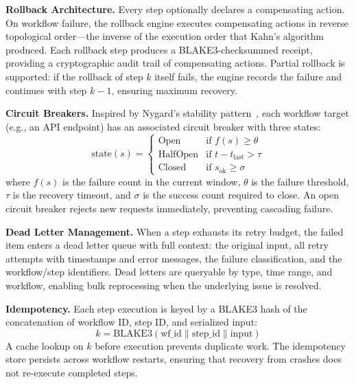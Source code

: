 \documentclass[10pt, twocolumn]{article}
\begin{document}
\textbf{Rollback Architecture.} Every step optionally declares a compensating action. On workflow failure, the rollback engine executes compensating actions in reverse topological order---the inverse of the execution order that Kahn's algorithm produced. Each rollback step produces a BLAKE3-checksummed receipt, providing a cryptographic audit trail of compensating actions. Partial rollback is supported: if the rollback of step $k$ itself fails, the engine records the failure and continues with step $k-1$, ensuring maximum recovery.

\textbf{Circuit Breakers.} Inspired by Nygard's stability pattern~\cite{nygard2007release}, each workflow target (e.g., an API endpoint) has an associated circuit breaker with three states:
\begin{equation}
\text{state}(s) = \begin{cases}
\text{Open} & \text{if } f(s) \geq \theta \\
\text{HalfOpen} & \text{if } t - t_{\text{last}} > \tau \\
\text{Closed} & \text{if } s_{\text{ok}} \geq \sigma
\end{cases}
\label{eq:circuit}
\end{equation}
where $f(s)$ is the failure count in the current window, $\theta$ is the failure threshold, $\tau$ is the recovery timeout, and $\sigma$ is the success count required to close. An open circuit breaker rejects new requests immediately, preventing cascading failure.

\textbf{Dead Letter Management.} When a step exhausts its retry budget, the failed item enters a dead letter queue with full context: the original input, all retry attempts with timestamps and error messages, the failure classification, and the workflow/step identifiers. Dead letters are queryable by type, time range, and workflow, enabling bulk reprocessing when the underlying issue is resolved.

\textbf{Idempotency.} Each step execution is keyed by a BLAKE3 hash of the concatenation of workflow ID, step ID, and serialized input:
\begin{equation}
k = \text{BLAKE3}(\text{wf\_id} \mathbin\| \text{step\_id} \mathbin\| \text{input})
\label{eq:idemp}
\end{equation}
A cache lookup on $k$ before execution prevents duplicate work. The idempotency store persists across workflow restarts, ensuring that recovery from crashes does not re-execute completed steps.

\end{document}
